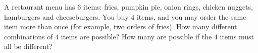 A restaurant menu has $6$ items: fries, pumpkin pie, onion rings, chicken nuggets, hamburgers and cheeseburgers. You buy $4$ items, and you may order the same item more than once (for example, two orders of fries). How many different combinations of $4$ items are possible? How many are possible if the $4$ items must all be different?
